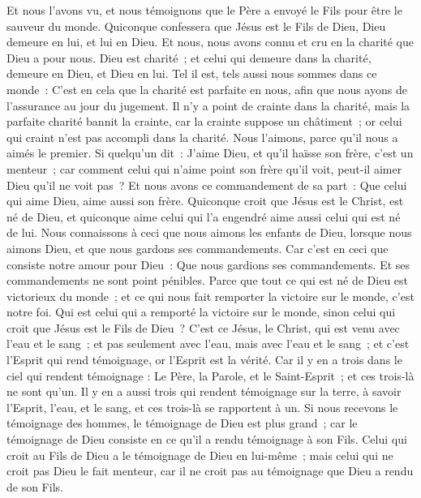 \begin{multicols}{2}
Et nous l'avons vu, et nous témoignons que le Père a envoyé le Fils pour être le sauveur du monde.
Quiconque confessera que Jésus est le Fils de Dieu, Dieu demeure en lui, et lui en Dieu.
Et nous, nous avons connu et cru en la charité que Dieu a pour nous. Dieu est charité~; et celui qui demeure dans la charité, demeure en Dieu, et Dieu en lui.
Tel il est, tels aussi nous sommes dans ce monde~: C'est en cela que la charité est parfaite en nous, afin que nous ayons de l'assurance au jour du jugement.
Il n'y a point de crainte dans la charité, mais la parfaite charité bannit la crainte, car la crainte suppose un châtiment~; or celui qui craint n'est pas accompli dans la charité.
Nous l'aimons, parce qu'il nous a aimés le premier.
Si quelqu'un dit~: J'aime Dieu, et qu'il haïsse son frère, c'est un menteur~; car comment celui qui n'aime point son frère qu'il voit, peut-il aimer Dieu qu'il ne voit pas~?
Et nous avons ce commandement de sa part~: Que celui qui aime Dieu, aime aussi son frère.
\VerseOne{}Quiconque croit que Jésus est le Christ, est né de Dieu, et quiconque aime celui qui l'a engendré aime aussi celui qui est né de lui.
Nous connaissons à ceci que nous aimons les enfants de Dieu, lorsque nous aimons Dieu, et que nous gardons ses commandements.
Car c'est en ceci que consiste notre amour pour Dieu~: Que nous gardions ses commandements. Et ses commandements ne sont point pénibles.
Parce que tout ce qui est né de Dieu est victorieux du monde~; et ce qui nous fait remporter la victoire sur le monde, c'est notre foi.
Qui est celui qui a remporté la victoire sur le monde, sinon celui qui croit que Jésus est le Fils de Dieu~?
C'est ce Jésus, le Christ, qui est venu avec l'eau et le sang~; et pas seulement avec l'eau, mais avec l'eau et le sang~; et c'est l'Esprit qui rend témoignage, or l'Esprit est la vérité.
Car il y en a trois dans le ciel qui rendent témoignage : Le Père, la Parole, et le Saint-Esprit~; et ces trois-là ne sont qu'un.
Il y en a aussi trois qui rendent témoignage sur la terre, à savoir l'Esprit, l'eau, et le sang, et ces trois-là se rapportent à un.
Si nous recevons le témoignage des hommes, le témoignage de Dieu est plus grand~; car le témoignage de Dieu consiste en ce qu'il a rendu témoignage à son Fils.
Celui qui croit au Fils de Dieu a le témoignage de Dieu en lui-même~; mais celui qui ne croit pas Dieu le fait menteur, car il ne croit pas au témoignage que Dieu a rendu de son Fils.

\end{multicols}
